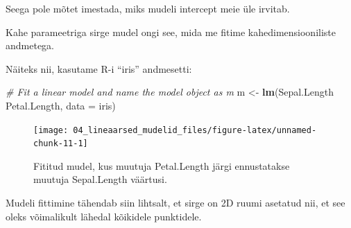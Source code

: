 \documentclass[]{book}
\newenvironment{Shaded}{\begin{snugshade}}{\end{snugshade}}
\newcommand{\CommentTok}[1]{\textcolor[rgb]{0.56,0.35,0.01}{\textit{#1}}}
\newcommand{\DataTypeTok}[1]{\textcolor[rgb]{0.13,0.29,0.53}{#1}}
\newcommand{\DecValTok}[1]{\textcolor[rgb]{0.00,0.00,0.81}{#1}}
\newcommand{\KeywordTok}[1]{\textcolor[rgb]{0.13,0.29,0.53}{\textbf{#1}}}
\newcommand{\NormalTok}[1]{#1}
\newcommand{\OperatorTok}[1]{\textcolor[rgb]{0.81,0.36,0.00}{\textbf{#1}}}
\newcommand{\OtherTok}[1]{\textcolor[rgb]{0.56,0.35,0.01}{#1}}
\newcommand{\StringTok}[1]{\textcolor[rgb]{0.31,0.60,0.02}{#1}}
\begin{document}
Seega pole mõtet imestada, miks mudeli intercept meie üle irvitab.

Kahe parameetriga sirge mudel ongi see, mida me fitime kahedimensiooniliste andmetega.

Näiteks nii, kasutame R-i ``iris'' andmesetti:

\begin{Shaded}
\begin{Highlighting}[]
\CommentTok{# Fit a linear model and name the model object as m}
\NormalTok{m <-}\StringTok{ }\KeywordTok{lm}\NormalTok{(Sepal.Length }\OperatorTok{~}\StringTok{ }\NormalTok{Petal.Length, }\DataTypeTok{data =}\NormalTok{ iris)}
\end{Highlighting}
\end{Shaded}

\begin{Shaded}
\end{Shaded}

\begin{figure}

{\centering \texttt{[image: 04\_lineaarsed\_mudelid\_files/figure-latex/unnamed-chunk-11-1]} 

}

\caption{Fititud mudel, kus muutuja Petal.Length järgi ennustatakse muutuja Sepal.Length väärtusi.}\label{fig:unnamed-chunk-11}
\end{figure}

Mudeli fittimine tähendab siin lihtsalt, et sirge on 2D ruumi asetatud nii, et see oleks võimalikult lähedal kõikidele punktidele.
\end{document}
